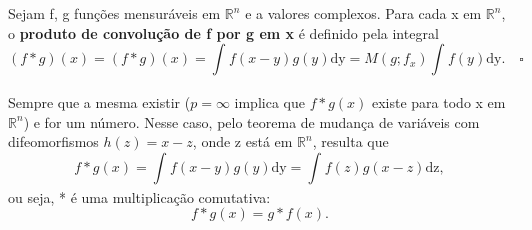 \documentclass[../distribution_theory_notes.tex]{subfiles}
\begin{document}
  \begin{def*}
    Sejam f, g funções mensuráveis em \(\mathbb{R}^{n}\) e a valores complexos. Para cada x em \(\mathbb{R}^{n}\), o \textbf{produto de convolução de f por g em x} é definido pela integral 
      \[
        (f*g)(x)=(f*g)(x) = \int_{}^{}f(x-y)g(y) \mathrm{dy} = M(g; f_x)\int_{}^{}f(y) \mathrm{dy}. \quad \square
      \]
  \end{def*}
  Sempre que a mesma existir (\(p=\infty\) implica que \(f*g(x)\) existe para todo x em \(\mathbb{R}^{n}\)) e for um número. Nesse caso, pelo teorema de mudança de variáveis com difeomorfismos \(h(z)=x-z\), onde z está em \(\mathbb{R}^{n}\), resulta que 
    \[
      f*g(x)=\int_{}^{}f(x-y)g(y) \mathrm{dy} = \int_{}^{}f(z)g(x-z) \mathrm{dz},
    \]
    ou seja, * é uma multiplicação comutativa:
      \[
        f*g(x)=g*f(x).
      \]
\end{document}
